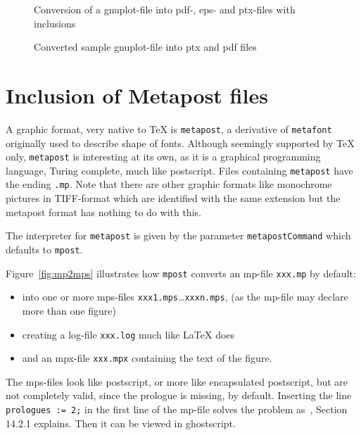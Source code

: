 \documentclass[12pt]{book}
\begin{document}
\begin{figure}[htb]
\begin{center}

\end{center}
\caption{\label{fig:gp2pdf}Conversion of a gnuplot-file 
into pdf-, eps- and ptx-files with inclusions}
\end{figure}

\begin{figure}[htb]
\begin{center}

\end{center}
\caption{\label{fig:gnuplot}
Converted sample gnuplot-file into ptx and pdf files }
\end{figure}


\section{Inclusion of Metapost files}\label{sec:metapost}

A graphic format, very native to TeX is {\tt metapost}, 
a derivative of {\tt metafont} originally used to describe shape of fonts. 
Although seemingly supported by \TeX{} only, 
{\tt metapost} is interesting at its own, 
as it is a graphical programming language, 
Turing complete, much like postscript. 
Files containing {\tt metapost} have the ending {\tt .mp}. 
Note that there are other graphic formats 
like monochrome pictures in TIFF-format 
which are identified with the same extension 
but the metapost format has nothing to do with this. 

The interpreter for {\tt metapost} 
is given by the parameter {\tt metapostCommand} 
which defaults to {\tt mpost}. 


Figure~\ref{fig:mp2mps} illustrates how {\tt mpost} converts an \gls{mp}-file 
{\tt xxx.mp} by default: 
%
\begin{itemize}
\item
into one or more \gls{mps}-files {\tt xxx1.mps}\dots {\tt xxxn.mps}, 
(as the mp-file may declare more than one figure) 
\item
creating a log-file {\tt xxx.log} much like \LaTeX{} does 
\item
and an \gls{mpx}-file {\tt xxx.mpx} containing the text of the figure. 
\end{itemize}

The mps-files look like postscript, or more like encapsulated postscript, 
but are not completely valid, since the prologue is missing, by default. 
Inserting the line {\tt prologues := 2;} in the first line of the mp-file 
solves the problem as~\cite{MPost}, Section 14.2.1 explains. 
Then it can be viewed in ghostscript. 
\end{document}
